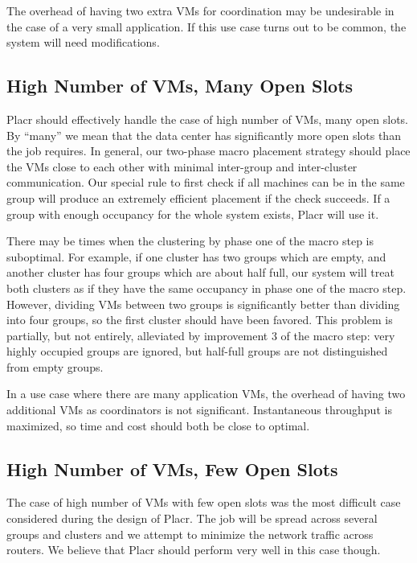 \documentclass[11pt]{article}
\begin{document}
The overhead of having two extra VMs for coordination may be undesirable in the case of a very small application.  If this use case turns out to be common, the system will need modifications.

\subsection{High Number of VMs, Many Open Slots}

Placr should effectively handle the case of high number of VMs, many open slots.  By ``many'' we mean that the data center has significantly more open slots than the job requires. In general, our two-phase macro placement strategy should place the VMs close to each other with minimal inter-group and inter-cluster communication.  Our special rule to first check if all machines can be in the same group will produce an extremely efficient placement if the check succeeds.  If a group with enough occupancy for the whole system exists, Placr will use it.

There may be times when the clustering by phase one of the macro step is suboptimal. For example, if one cluster has two groups which are empty, and another cluster has four groups which are about half full, our system will treat both clusters as if they have the same occupancy in phase one of the macro step. However, dividing VMs between two groups is significantly better than dividing into four groups, so the first cluster should have been favored. This problem is partially, but not entirely, alleviated by improvement 3 of the macro step: very highly occupied groups are ignored, but half-full groups are not distinguished from empty groups.

In a use case where there are many application VMs, the overhead of having two additional VMs as coordinators is not significant.  Instantaneous throughput is maximized, so time and cost should both be close to optimal.


\subsection{High Number of VMs, Few Open Slots}

The case of high number of VMs with few open slots was the most difficult case considered during the design of Placr.  The job will be spread across several groups and clusters and we attempt to minimize the network traffic across routers.  We believe that Placr should perform very well in this case though.
\end{document}
